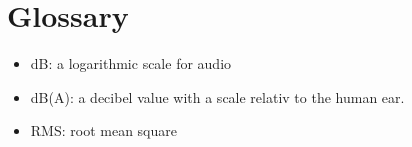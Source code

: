 \section{Glossary}
\begin{itemize}
    \item dB: a logarithmic scale for audio
    \item dB(A): a decibel value with a scale relativ to the human ear.
    \item RMS: root mean square
\end{itemize}

